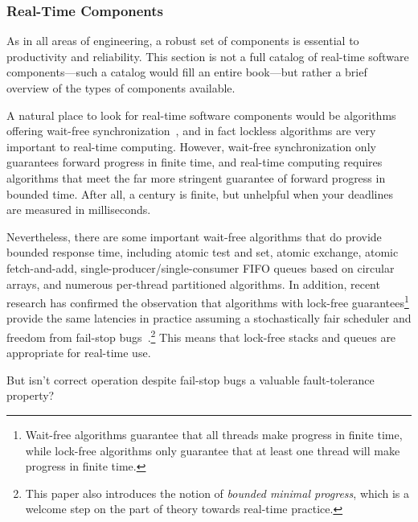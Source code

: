 \subsubsection{Real-Time Components}
\label{sec:rt:Real-Time Components}

As in all areas of engineering, a robust set of components is essential
to productivity and reliability.
This section is not a full catalog of real-time software components---such
a catalog would fill an entire book---but rather a brief overview of the
types of components available.

A natural place to look for real-time software components would be
algorithms offering wait-free
synchronization~\cite{Herlihy91}, and in fact lockless
algorithms are very important to real-time computing.
However, wait-free synchronization only guarantees forward progress in
finite time, and real-time computing requires algorithms that meet the
far more stringent guarantee of forward progress in bounded time.
After all, a century is finite, but unhelpful when your deadlines are
measured in milliseconds.

Nevertheless, there are some important wait-free algorithms that do
provide bounded response time, including atomic test and set,
atomic exchange,
atomic fetch-and-add,
single-producer/single-consumer FIFO queues based on circular arrays,
and numerous per-thread partitioned algorithms.
In addition, recent research has confirmed the observation that
algorithms with lock-free guarantees\footnote{
	Wait-free algorithms guarantee that all threads make progress in
	finite time, while lock-free algorithms only guarantee that at
	least one thread will make progress in finite time.}
provide the same latencies in practice assuming a stochastically
fair scheduler and freedom from fail-stop
bugs~\cite{DanAlitarh2013PracticalProgress}.\footnote{
	This paper also introduces the notion of \emph{bounded minimal
	progress}, which is a welcome step on the part of theory
	towards real-time practice.}
This means that lock-free stacks and queues are appropriate
for real-time use.

\QuickQuiz{}
	But isn't correct operation despite fail-stop bugs
	a valuable fault-tolerance property?
 \QuickQuizEnd

